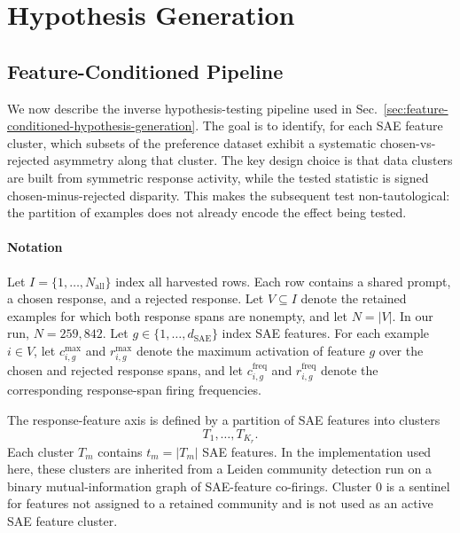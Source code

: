 \documentclass{article} %
\begin{document}
\clearpage
\section{Hypothesis Generation}


\subsection{Feature-Conditioned Pipeline}
\label{app:global-hypothesis-generation}

We now describe the inverse hypothesis-testing pipeline used in Sec.~\ref{sec:feature-conditioned-hypothesis-generation}. The goal is to identify, for each SAE feature cluster, which subsets of the preference dataset exhibit a systematic chosen-vs-rejected asymmetry along that cluster. The key design choice is that data clusters are built from symmetric response activity, while the tested statistic is signed chosen-minus-rejected disparity. This makes the subsequent test non-tautological: the partition of examples does not already encode the effect being tested.

\paragraph{Notation}
Let $I=\{1,\ldots,N_{\text{all}}\}$ index all harvested rows. Each row contains a shared prompt, a chosen response, and a rejected response. Let $V\subseteq I$ denote the retained examples for which both response spans are nonempty, and let $N=|V|$. In our run, $N=259{,}842$. Let $g \in \{1,\ldots,d_{\text{SAE}}\}$ index SAE features. For each example $i\in V$, let $c^{\max}_{i,g}$ and $r^{\max}_{i,g}$ denote the maximum activation of feature $g$ over the chosen and rejected response spans, and let $c^{\text{freq}}_{i,g}$ and $r^{\text{freq}}_{i,g}$ denote the corresponding response-span firing frequencies.

The response-feature axis is defined by a partition of SAE features into clusters
\begin{equation}
T_1,\ldots,T_{K_r}.
\end{equation}
Each cluster $T_m$ contains $t_m=|T_m|$ SAE features. In the implementation used here, these clusters are inherited from a Leiden community detection run on a binary mutual-information graph of SAE-feature co-firings. Cluster $0$ is a sentinel for features not assigned to a retained community and is not used as an active SAE feature cluster.
\end{document}
